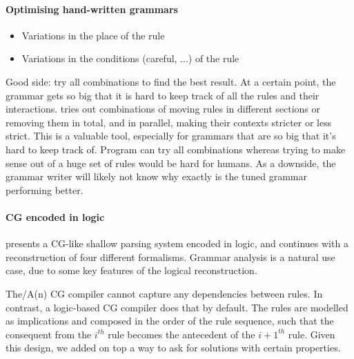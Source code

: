 


\paragraph{Optimising hand-written grammars}
\begin{itemize}
\item Variations in the place of the rule
\item Variations in the conditions (careful, ...) of the rule
\end{itemize}
Good side: try all combinations to find the best result. 
At a certain point, the grammar gets so big that it is hard to keep track of all the rules and their interactions. \cite{bick2013tuning} tries out combinations of moving rules in different sections or removing them in total, and in parallel, making their contexts stricter or less strict. 
This is a valuable tool, especially for grammars that are so big that it's hard to keep track of. Program can try all combinations whereas trying to make sense out of a huge set of rules would be hard for humans.
As a downside, the grammar writer will likely not know why exactly is the tuned grammar performing better.


\paragraph{CG encoded in logic}

\cite{lager98} presents a CG-like shallow parsing system encoded in logic, and \cite{lager_nivre01} continues with a reconstruction of four different formalisms.
Grammar analysis is a natural use case, due to some key features of the logical reconstruction.

The/A(n) 
CG compiler
 cannot capture any dependencies between rules.
In contrast, a logic-based CG compiler does that by default. 
The rules are modelled as implications and composed in the order of the rule sequence, such that 
the consequent from the $i^{th}$ rule becomes the antecedent of the $i+1^{th}$ rule.
Given this design, we added on top a way to ask for solutions with certain properties.

